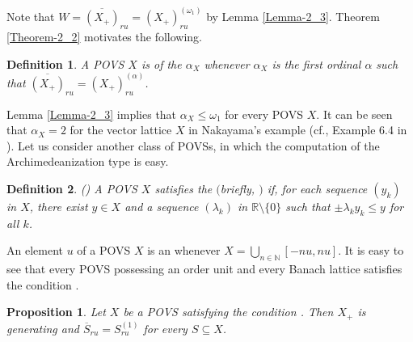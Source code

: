 \documentclass[10pt]{article}
\newtheorem{proposition}{Proposition}[section]
\newtheorem{definition}{Definition}[section]
\renewcommand{\a}{\alpha}
\newcommand{\w}{\omega}
\begin{document}
\noindent
Note that $W=\overline{(X_+)}_{ru}=(X_+)^{({\w}_1)}_{ru}$ by Lemma \ref{Lemma-2_3}. Theorem \ref{Theorem-2_2} motivates the following.

\begin{definition}\label{Definition-2_3}
A POVS $X$ is of the {\color{blue}{Archimedeanization type}} ${\a}_X$ whenever
${\a}_X$ is the first ordinal ${\a}$ such that $\overline{(X_+)}_{ru}=(X_+)^{({\a})}_{ru}$.
\end{definition}

\noindent
Lemma \ref{Lemma-2_3} implies that ${\a}_X\leqslant{\w}_1$ for every POVS $X$. 
It can be seen that ${\a}_X=2$ for the vector lattice $X$ in Nakayama's example 
(cf., Example 6.4 in \cite{LM-1967}). Let us consider another class of POVSs, in which the computation of the Archimedeanization type is easy. 

\begin{definition}\label{Definition-2_4}
{\rm (\cite[Definition 3.1]{EEG-2026})}
A POVS $X$ satisfies the {} $($briefly, {\color{blue}{$X\in (R)$}}$)$ if, for each sequence $(y_k)$ in $X$, there exist $y\in X$ 
and a sequence $(\lambda_k)$ in $\mathbb{R}\setminus\{0\}$ such that $\pm\lambda_k y_k\leqslant y$ for all $k$.
\end{definition}

\noindent
An element $u$ of a POVS $X$ is an {\color{blue}{order unit}} whenever $X=\bigcup\limits_{n\in\mathbb{N}}[-nu,nu]$.
It is easy to see that every POVS possessing an order unit and every Banach lattice satisfies the condition .  

\begin{proposition}\label{Proposition-2_2}
Let $X$ be a POVS satisfying the condition .
Then $X_+$ is generating and $\overline{S}_{ru}=S^{(1)}_{ru}$ for every $S\subseteq X$.
\end{proposition}
\end{document}
